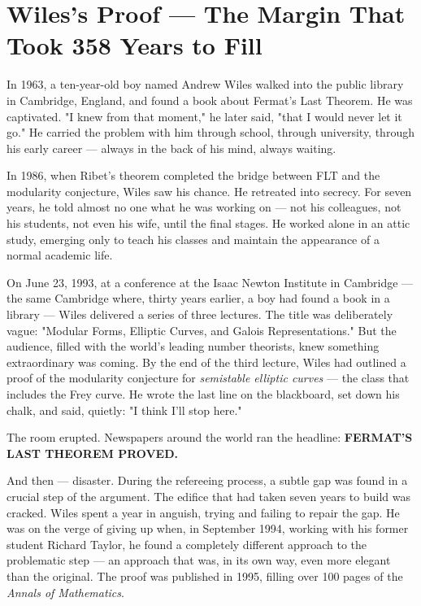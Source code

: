 \bigskip


\section{Wiles's Proof --- The Margin That Took 358 Years to Fill}

In 1963, a ten-year-old boy named Andrew Wiles walked into the public library in Cambridge, England, and found a book about Fermat's Last Theorem. He was captivated. "I knew from that moment," he later said, "that I would never let it go." He carried the problem with him through school, through university, through his early career --- always in the back of his mind, always waiting.

In 1986, when Ribet's theorem completed the bridge between FLT and the modularity conjecture, Wiles saw his chance. He retreated into secrecy. For seven years, he told almost no one what he was working on --- not his colleagues, not his students, not even his wife, until the final stages. He worked alone in an attic study, emerging only to teach his classes and maintain the appearance of a normal academic life.

On June 23, 1993, at a conference at the Isaac Newton Institute in Cambridge --- the same Cambridge where, thirty years earlier, a boy had found a book in a library --- Wiles delivered a series of three lectures. The title was deliberately vague: "Modular Forms, Elliptic Curves, and Galois Representations." But the audience, filled with the world's leading number theorists, knew something extraordinary was coming. By the end of the third lecture, Wiles had outlined a proof of the modularity conjecture for \textit{semistable elliptic curves} --- the class that includes the Frey curve. He wrote the last line on the blackboard, set down his chalk, and said, quietly: "I think I'll stop here."

The room erupted. Newspapers around the world ran the headline: \textbf{FERMAT'S LAST THEOREM PROVED.}

And then --- disaster. During the refereeing process, a subtle gap was found in a crucial step of the argument. The edifice that had taken seven years to build was cracked. Wiles spent a year in anguish, trying and failing to repair the gap. He was on the verge of giving up when, in September 1994, working with his former student Richard Taylor, he found a completely different approach to the problematic step --- an approach that was, in its own way, even more elegant than the original. The proof was published in 1995, filling over 100 pages of the \textit{Annals of Mathematics}.

